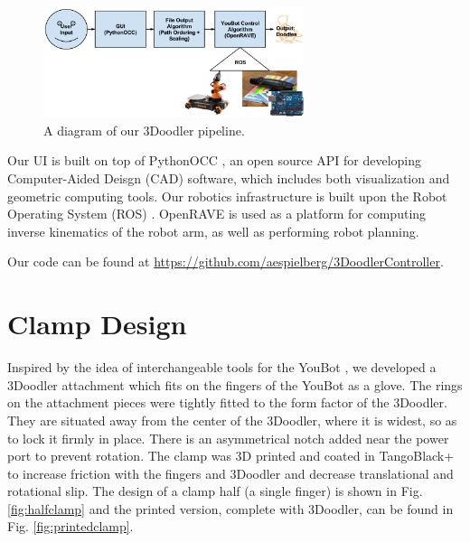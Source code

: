 \documentclass[conference]{acmsiggraph}
\begin{document}
\begin{figure}[t]
\centering
\includegraphics[width=3.0in]{images/system_arch.png}
\caption{A diagram of our 3Doodler pipeline.}
\label{fig:systemarchitecture}
\end{figure}

Our UI is built on top of PythonOCC \cite{PythonOCC}, an open source API for developing Computer-Aided Deisgn (CAD) software, which includes both visualization and geometric computing tools.  Our robotics infrastructure is built upon the Robot Operating System (ROS) \cite{ROS}.  OpenRAVE \cite{OpenRAVE} is used as a platform for computing inverse kinematics of the robot arm, as well as performing robot planning.

Our code can be found at \url{https://github.com/aespielberg/3DoodlerController}.




\section{Clamp Design}
Inspired by the idea of interchangeable tools for the YouBot \cite{Knepper13}, we developed a 3Doodler attachment which fits on the fingers of the YouBot as a glove.  The rings on the attachment pieces were tightly fitted to the form factor of the 3Doodler. They are situated away from the center of the 3Doodler, where it is widest, so as to lock it firmly in place. There is an asymmetrical notch added near the power port to prevent rotation.  The clamp was 3D printed and coated in TangoBlack+ \cite{TangoBlack} to increase friction with the fingers and 3Doodler and decrease translational and rotational slip.  The design of a clamp half (a single finger) is shown in Fig. \ref{fig:halfclamp} and the printed version, complete with 3Doodler, can be found in Fig. \ref{fig:printedclamp}.  
\end{document}
